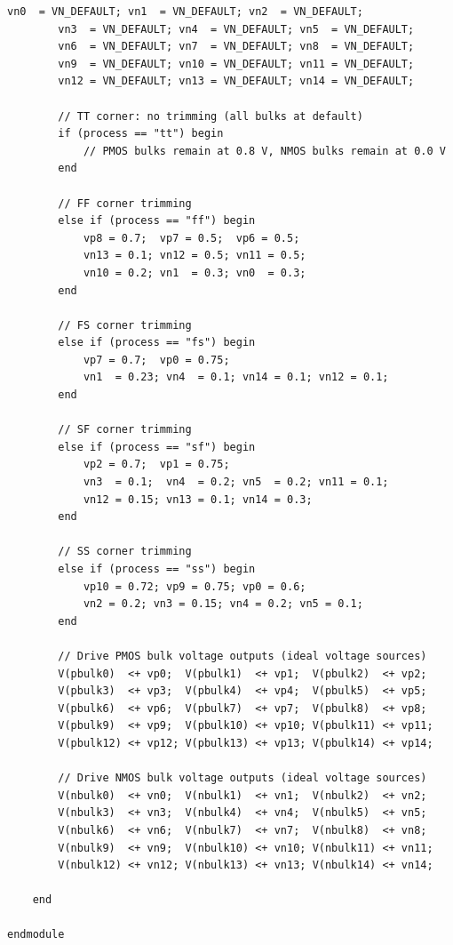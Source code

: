 \begin{lstlisting}[style=verilogA, caption={Verilog-A model of the per-slicer body bias trimming controller.}, label={lst:veriloga}]
        vn0  = VN_DEFAULT; vn1  = VN_DEFAULT; vn2  = VN_DEFAULT;
        vn3  = VN_DEFAULT; vn4  = VN_DEFAULT; vn5  = VN_DEFAULT;
        vn6  = VN_DEFAULT; vn7  = VN_DEFAULT; vn8  = VN_DEFAULT;
        vn9  = VN_DEFAULT; vn10 = VN_DEFAULT; vn11 = VN_DEFAULT;
        vn12 = VN_DEFAULT; vn13 = VN_DEFAULT; vn14 = VN_DEFAULT;

        // TT corner: no trimming (all bulks at default)
        if (process == "tt") begin
            // PMOS bulks remain at 0.8 V, NMOS bulks remain at 0.0 V
        end

        // FF corner trimming
        else if (process == "ff") begin
            vp8 = 0.7;  vp7 = 0.5;  vp6 = 0.5;
            vn13 = 0.1; vn12 = 0.5; vn11 = 0.5;
            vn10 = 0.2; vn1  = 0.3; vn0  = 0.3;
        end

        // FS corner trimming
        else if (process == "fs") begin
            vp7 = 0.7;  vp0 = 0.75;
            vn1  = 0.23; vn4  = 0.1; vn14 = 0.1; vn12 = 0.1;
        end

        // SF corner trimming
        else if (process == "sf") begin
            vp2 = 0.7;  vp1 = 0.75;
            vn3  = 0.1;  vn4  = 0.2; vn5  = 0.2; vn11 = 0.1;
            vn12 = 0.15; vn13 = 0.1; vn14 = 0.3;
        end

        // SS corner trimming
        else if (process == "ss") begin
            vp10 = 0.72; vp9 = 0.75; vp0 = 0.6;
            vn2 = 0.2; vn3 = 0.15; vn4 = 0.2; vn5 = 0.1;
        end

        // Drive PMOS bulk voltage outputs (ideal voltage sources)
        V(pbulk0)  <+ vp0;  V(pbulk1)  <+ vp1;  V(pbulk2)  <+ vp2;
        V(pbulk3)  <+ vp3;  V(pbulk4)  <+ vp4;  V(pbulk5)  <+ vp5;
        V(pbulk6)  <+ vp6;  V(pbulk7)  <+ vp7;  V(pbulk8)  <+ vp8;
        V(pbulk9)  <+ vp9;  V(pbulk10) <+ vp10; V(pbulk11) <+ vp11;
        V(pbulk12) <+ vp12; V(pbulk13) <+ vp13; V(pbulk14) <+ vp14;

        // Drive NMOS bulk voltage outputs (ideal voltage sources)
        V(nbulk0)  <+ vn0;  V(nbulk1)  <+ vn1;  V(nbulk2)  <+ vn2;
        V(nbulk3)  <+ vn3;  V(nbulk4)  <+ vn4;  V(nbulk5)  <+ vn5;
        V(nbulk6)  <+ vn6;  V(nbulk7)  <+ vn7;  V(nbulk8)  <+ vn8;
        V(nbulk9)  <+ vn9;  V(nbulk10) <+ vn10; V(nbulk11) <+ vn11;
        V(nbulk12) <+ vn12; V(nbulk13) <+ vn13; V(nbulk14) <+ vn14;

    end

endmodule
\end{lstlisting}
